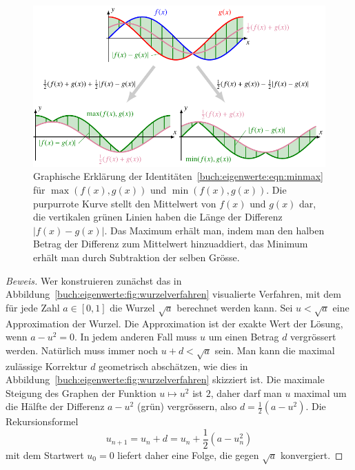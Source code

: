 \begin{figure}
\centering
\includegraphics{chapters/40-eigenwerte/images/minmax.pdf}
\caption{Graphische Erklärung der
Identitäten~\eqref{buch:eigenwerte:eqn:minmax} für
$\max(f(x),g(x))$ und $\min(f(x),g(x))$.
Die purpurrote Kurve stellt den Mittelwert von $f(x)$ und $g(x)$ dar,
die vertikalen grünen Linien haben die Länge der Differenz $|f(x)-g(x)|$.
Das Maximum erhält man, indem man den halben Betrag der Differenz zum
Mittelwert hinzuaddiert, das Minimum erhält man durch Subtraktion
der selben Grösse.
\label{buch:eigenwerte:fig:minmax}}
\end{figure}

\begin{proof}[Beweis]
Wer konstruieren zunächst das in
Abbildung~\ref{buch:eigenwerte:fig:wurzelverfahren}
visualierte Verfahren, mit dem für jede Zahl $a\in[0,1]$
die Wurzel $\sqrt{a}$ berechnet werden kann.
Sei $u < \sqrt{a}$ eine Approximation der Wurzel.
Die Approximation ist der exakte Wert der Lösung, wenn $a-u^2=0$.
In jedem anderen Fall muss $u$ um einen Betrag $d$ vergrössert werden.
Natürlich muss immer noch $u+d<\sqrt{a}$ sein.
Man kann die maximal zulässige Korrektur $d$ geometrisch abschätzen,
wie dies in Abbildung~\ref{buch:eigenwerte:fig:wurzelverfahren}
skizziert ist.
Die maximale Steigung des Graphen der Funktion $u\mapsto u^2$ ist $2$,
daher darf man $u$ maximal um die Hälfte der Differenz $a-u^2$ (grün)
vergrössern, also $d=\frac12(a-u^2)$.
Die Rekursionsformel
\[
u_{n+1} = u_n + d = u_n + \frac12(a-u_n^2)
\]
mit dem Startwert $u_0=0$ liefert daher eine 
Folge, die gegen $\sqrt{a}$ konvergiert.
\end{proof}

